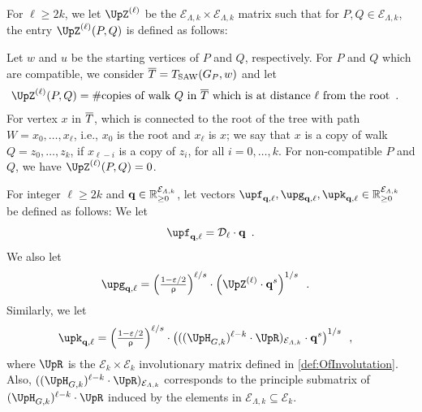 \documentclass[11pt,reqno]{amsart}
\numberwithin{equation}{section}
\newcommand{\cE}{{\mathcal{E}}}
\newcommand{\applegreen}[1]{ {\color{applegreen}#1}}
\newcommand{\amethyst}[1]{{\color{amethyst}#1} }
\newcommand{\blue}[1]{{\color{blue}#1}}
\newcommand{\bluepigment}[1]{{\color{blue(pigment)}#1}}
\newcommand{\capri}[1]{{\color{capri}#1}}
\newcommand{\cadmiumgreen}[1]{{\color{cadmiumgreen}#1}}
\newcommand{\darkmagenta}[1]{{\color{darkmagenta}#1}}
\newcommand{\goldenbrown}[1]{{\color{goldenbrown}#1}}
\newcommand{\heliotrope}[1]{{\color{heliotrope}#1}}
\newcommand{\iris}[1]{{\color{iris}#1}}
\newcommand{\red}[1]{{\color{red}#1}}
\newcommand{\ExtV}{\iris{\cE}}
\newcommand{\pfs}{\darkmagenta{s}}
\newcommand{\Tsaw}{T_{\rm SAW}}
\newcommand{\NBMatrix}{\cadmiumgreen{\UpH}_{G,\kk}}
\newcommand{\Invol}{\UpR}
\renewcommand{\applegreen}[1]{#1}
\renewcommand{\amethyst}[1]{#1}
\renewcommand{\blue}[1]{#1}
\renewcommand{\bluepigment}[1]{#1}
\renewcommand{\capri}[1]{#1}
\renewcommand{\cadmiumgreen}[1]{#1}
\renewcommand{\darkmagenta}[1]{#1}
\renewcommand{\goldenbrown}[1]{#1}
\renewcommand{\heliotrope}[1]{#1}
\renewcommand{\iris}[1]{#1}
\renewcommand{\red}[1]{#1}
\newcommand{\ki}{\capri{i}}
\newcommand{\kk}{\bluepigment{k}}
\newcommand{\kell}{{\color{green(pigment)}\ell}}%
\newcommand{\kP}{\goldenbrown{P}}
\newcommand{\kQ}{\amethyst{Q}}
\newcommand{\ku}{\red{u}}
\newcommand{\kW}{\blue{W}}
\newcommand{\kw}{\blue{w}}
\newcommand{\kx}{\heliotrope{x}}
\newcommand{\kz}{\cadmiumgreen{z}}
\renewcommand{\ki}{i}
\renewcommand{\kk}{k}
\renewcommand{\kell}{\ell}
\renewcommand{\kP}{P}
\renewcommand{\kQ}{Q}
\renewcommand{\ku}{u}
\renewcommand{\kW}{W}
\renewcommand{\kw}{w}
\renewcommand{\kx}{x}
\renewcommand{\kz}{z}
\newcommand{\SingBound}{\uprho}
\begin{document}
For $\kell\geq 2\kk$, we let $\TAdj^{(\kell)}$ be the $\ExtV_{\Lambda,\kk}\times \ExtV_{\Lambda,\kk}$ 
matrix such that for $\kP,\kQ \in \ExtV_{\Lambda,\kk}$, the entry $\TAdj^{(\kell)}(\kP,\kQ)$ is defined 
as follows: 



Let $\kw$ and $\ku$ be the starting vertices of $\kP$ and $\kQ$, respectively. For $\kP$ and 
$\kQ$ which are compatible,   we consider $\TPP=\Tsaw(\gext{G}{\kP}, \kw)$ and let 
%
\begin{align}\nonumber
\TAdj^{(\kell)}(\kP, \kQ) &=\# \textrm{copies of walk $\kQ$ in $\TPP$ which is at distance $\kell$ from the root} \enspace. 
\end{align}
For vertex $\kx$ in $\overline{T}$, which is connected to the root of the tree with path  $\kW=\kx_0, \ldots, \kx_{\kell}$, i.e., $\kx_0$ 
is the root and $\kx_{\kell}$ is $\kx$; we say that $\kx$ is  a copy of walk $\kQ=\kz_0,\ldots, \kz_{\kk}$, if $\kx_{\kell-\ki}$ is a copy of 
$\kz_{\ki}$, for all $\ki=0,\ldots, \kk$. 
%
 For non-compatible $\kP$ and $\kQ$, we have $\TAdj^{(\kell)}(\kP, \kQ) =0$. 



For integer $\kell\geq 2\kk$ and $\vtest \in \mathbb{R}^{\ExtV_{\Lambda,\kk}}_{\geq 0}$, 
let vectors $\vecF_{\vtest, \kell},\vecG_{\vtest, \kell}, \vecK_{\vtest, \kell} \in \mathbb{R}^{\ExtV_{\Lambda,\kk}}_{\geq 0}$ be 
defined as follows: We let 
% 
\begin{align}\label{eq:DefOfFvec}
\vecF_{\vtest, \kell}=\ExtdInfMatrixL_{\kell}\cdot \vtest \enspace.
\end{align}
% 
We also let 
\begin{align} \label{eq:DefOfGvec}
\vecG_{\vtest, \kell} &= \left( {\textstyle \frac{1-\varepsilon/2}{\SingBound}} \right)^{\kell/\pfs} \cdot 
\left( \TAdj^{(\kell)}\cdot \vtest^{\pfs}\right)^{1/\pfs}
\enspace.
\end{align}
% 
Similarly, we let
\begin{align} \label{eq:DefOfKvec}
\vecK_{\vtest, \kell}&= 
 {\textstyle \left(\frac{1-\varepsilon/2}{\SingBound}\right)^{\kell/\pfs} } \cdot 
% 
\left( ( ( \NBMatrix)^{\kell-\kk}\cdot \Invol)_{\ExtV_{\Lambda,\kk}} \cdot \vtest^{\pfs}\right)^{1/\pfs}
 \enspace,
\end{align}
% 
where $\Invol$ is the $\ExtV_{\kk}\times \ExtV_{\kk}$ involutionary matrix defined in \eqref{def:OfInvolutation}.
Also,  $(( \NBMatrix)^{{\kell-\kk}}\cdot \Invol)_{\ExtV_{\Lambda,\kk}}$ corresponds to the principle submatrix 
of $( \NBMatrix)^{\kell-\kk}\cdot \Invol$ induced by the elements in $\ExtV_{\Lambda, \kk}\subseteq \ExtV_{\kk}$.
\end{document}
